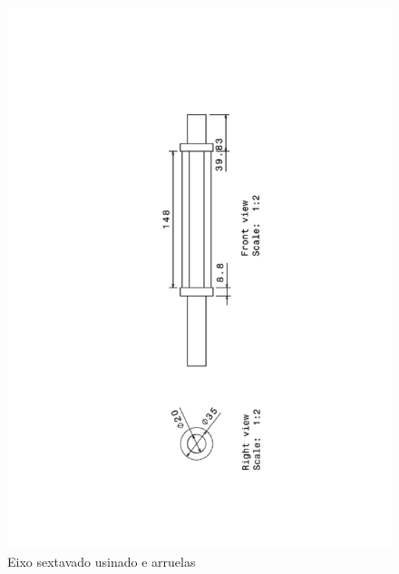 \begin{anexosenv}
\begin{figure}[!ht]
	\centering
		\includegraphics[scale=0.6]{figuras/estrutura/anexos/4.png}
	\caption{Eixo sextavado usinado e arruelas}
\end{figure}


\end{anexosenv}
